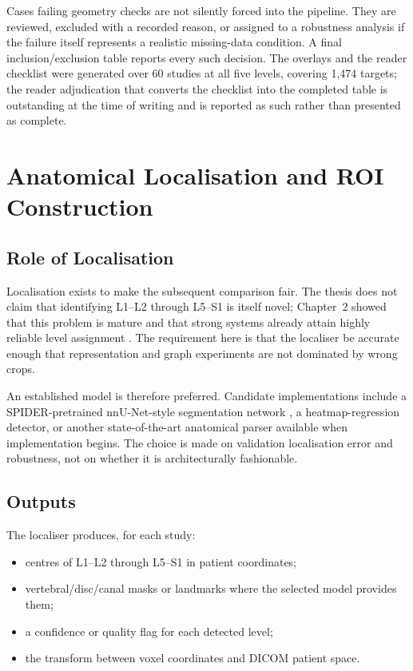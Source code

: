 Cases failing geometry checks are not silently forced into the pipeline. They
are reviewed, excluded with a recorded reason, or assigned to a robustness
analysis if the failure itself represents a realistic missing-data condition.
A final inclusion/exclusion table reports every such decision. The overlays
and the reader checklist were generated over 60 studies at all five levels,
covering 1{,}474 targets; the reader adjudication that converts the checklist
into the completed table is outstanding at the time of writing and is reported
as such rather than presented as complete.

\section{Anatomical Localisation and ROI Construction}
\label{sec:method-localisation}

\subsection{Role of Localisation}
\label{sec:method-localisation-role}

Localisation exists to make the subsequent comparison fair. The thesis does not
claim that identifying L1--L2 through L5--S1 is itself novel; Chapter~2 showed
that this problem is mature and that strong systems already attain highly
reliable level assignment \cite{pan2021automatically}. The requirement here is
that the localiser be accurate enough that representation and graph experiments
are not dominated by wrong crops.

An established model is therefore preferred. Candidate implementations include
a SPIDER-pretrained nnU-Net-style segmentation network
\cite{isensee2021nnunet,vandergraaf2024lumbar}, a heatmap-regression detector,
or another state-of-the-art anatomical parser available when implementation
begins. The choice is made on validation localisation error and robustness, not
on whether it is architecturally fashionable.

\subsection{Outputs}
\label{sec:method-localisation-output}

The localiser produces, for each study:

\begin{itemize}
  \item centres of L1--L2 through L5--S1 in patient coordinates;
  \item vertebral/disc/canal masks or landmarks where the selected model provides
        them;
  \item a confidence or quality flag for each detected level;
  \item the transform between voxel coordinates and DICOM patient space.
\end{itemize}

